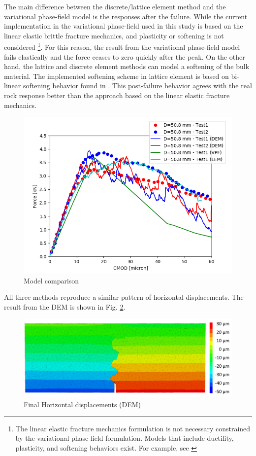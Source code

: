 The main difference between the discrete/lattice element method and the variational phase-field model is the responses after the failure.
While the current implementation in the variational phase-field used in this study is based on the linear elastic brittle fracture mechanics, and plasticity or softening is not 
considered \footnote{The linear elastic fracture mechanics formulation is not necessary constrained by the variational phase-field formulation. Models that include ductility, plasticity, 
and softening behaviors exist. For example, see \cite{Alessi2018}}.
For this reason, the result from the variational phase-field model fails elastically and the force ceases to zero quickly after the peak.
On the other hand, the lattice and discrete element methods can model a softening of the bulk material. The implemented softening scheme in lattice element is based on bi-linear softening behavior found in \cite{Inceetal2003}.
This post-failure behavior agrees with the real rock response better than the approach based on the linear elastic fracture mechanics.

\begin{figure}[!ht]
\centering
\includegraphics[width=1\textwidth]{figures/ME1_comp_updated.png}
\caption{Model comparison}
\label{fig:ME1_comparison}
\end{figure}

All three methods reproduce a similar pattern of horizontal displacements. The result from the DEM is shown in Fig. \ref{fig:ME1-xdis-dem}. 

\begin{figure}[!ht]
\centering
\includegraphics[width=1\textwidth]{figures/ME1-xdis-dem}
\caption{Final Horizontal displacements (DEM)}
\label{fig:ME1-xdis-dem}
\end{figure}

